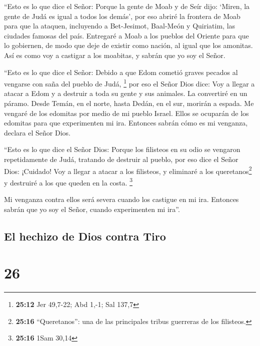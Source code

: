  ``Esto es lo que dice el Señor: Porque la gente de Moab y
de Seír dijo: `Miren, la gente de Judá es igual a todos los demás',
 por eso abriré la frontera de Moab para que la ataquen,
incluyendo a Bet-Jesimot, Baal-Meón y Quiriatim, las ciudades famosas
del país.  Entregaré a Moab a los pueblos del Oriente
para que lo gobiernen, de modo que deje de existir como nación, al igual
que los amonitas.  Así es como voy a castigar a los
moabitas, y sabrán que yo soy el Señor.

 ``Esto es lo que dice el Señor: Debido a que Edom
cometió graves pecados al vengarse con saña del pueblo de Judá,
\footnote{\textbf{25:12} Jer 49,7-22; Abd 1,-1; Sal 137,7}
 por eso el Señor Dios dice: Voy a llegar a atacar a Edom
y a destruir a toda su gente y sus animales. La convertiré en un páramo.
Desde Temán, en el norte, hasta Dedán, en el sur, morirán a espada.
 Me vengaré de los edomitas por medio de mi pueblo
Israel. Ellos se ocuparán de los edomitas para que experimenten mi ira.
Entonces sabrán cómo es mi venganza, declara el Señor Dios.

 ``Esto es lo que dice el Señor Dios: Porque los
filisteos en su odio se vengaron repetidamente de Judá, tratando de
destruir al pueblo,  por eso dice el Señor Dios:
¡Cuidado! Voy a llegar a atacar a los filisteos, y eliminaré a los
queretanos\footnote{\textbf{25:16} ``Queretanos'': una de las
  principales tribus guerreras de los filisteos.} y destruiré a los que
queden en la costa. \footnote{\textbf{25:16} 1Sam 30,14}

 Mi venganza contra ellos será severa cuando los castigue
en mi ira. Entonces sabrán que yo soy el Señor, cuando experimenten mi
ira''.

\hypertarget{el-hechizo-de-dios-contra-tiro}{%
\subsection{El hechizo de Dios contra
Tiro}\label{el-hechizo-de-dios-contra-tiro}}

\hypertarget{section-25}{%
\section{26}\label{section-25}}

